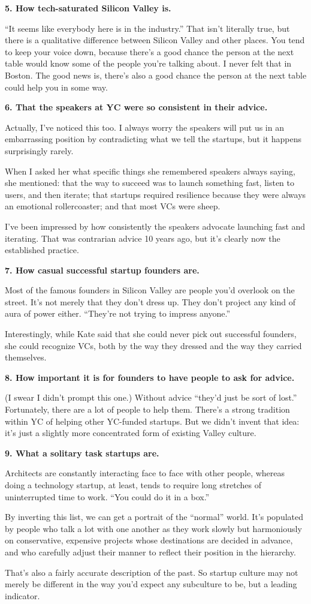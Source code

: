 \textbf{5. How tech-saturated Silicon Valley is.}

``It seems like everybody here is in the industry.'' That isn't
literally true, but there is a qualitative difference between Silicon
Valley and other places. You tend to keep your voice down, because
there's a good chance the person at the next table would know some of
the people you're talking about. I never felt that in Boston. The good
news is, there's also a good chance the person at the next table could
help you in some way.

\textbf{6. That the speakers at YC were so consistent in their advice.}

Actually, I've noticed this too. I always worry the speakers will put us
in an embarrassing position by contradicting what we tell the startups,
but it happens surprisingly rarely.

When I asked her what specific things she remembered speakers always
saying, she mentioned: that the way to succeed was to launch something
fast, listen to users, and then iterate; that startups required
resilience because they were always an emotional rollercoaster; and that
most VCs were sheep.

I've been impressed by how consistently the speakers advocate launching
fast and iterating. That was contrarian advice 10 years ago, but it's
clearly now the established practice.

\textbf{7. How casual successful startup founders are.}

Most of the famous founders in Silicon Valley are people you'd overlook
on the street. It's not merely that they don't dress up. They don't
project any kind of aura of power either. ``They're not trying to
impress anyone.''

Interestingly, while Kate said that she could never pick out successful
founders, she could recognize VCs, both by the way they dressed and the
way they carried themselves.

\textbf{8. How important it is for founders to have people to ask for
advice.}

(I swear I didn't prompt this one.) Without advice ``they'd just be sort
of lost.'' Fortunately, there are a lot of people to help them. There's
a strong tradition within YC of helping other YC-funded startups. But we
didn't invent that idea: it's just a slightly more concentrated form of
existing Valley culture.

\textbf{9. What a solitary task startups are.}

Architects are constantly interacting face to face with other people,
whereas doing a technology startup, at least, tends to require long
stretches of uninterrupted time to work. ``You could do it in a box.''

By inverting this list, we can get a portrait of the ``normal'' world.
It's populated by people who talk a lot with one another as they work
slowly but harmoniously on conservative, expensive projects whose
destinations are decided in advance, and who carefully adjust their
manner to reflect their position in the hierarchy.

That's also a fairly accurate description of the past. So startup
culture may not merely be different in the way you'd expect any
subculture to be, but a leading indicator.